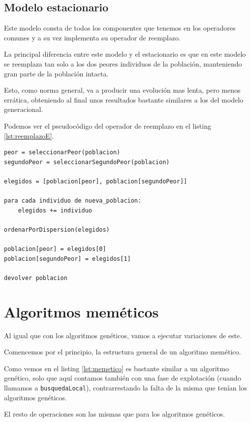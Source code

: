 \subsection{Modelo estacionario}

Este modelo consta de todos los componentes que tenemos en los operadores comunes y a su vez implementa su operador de reemplazo.

La principal diferencia entre este modelo y el estacionario es que en este modelo se reemplaza tan solo a los dos peores individuos de la población, manteniendo gran parte de la población intacta.

Esto, como norma general, va a producir una evolución mas lenta, pero menos errática, obteniendo al final unos resultados bastante similares a los del modelo generacional.

Podemos ver el pseudocódigo del operador de reemplazo en el listing \ref{lst:reemplazoE}.

\begin{lstlisting}[frame=single, caption={Reemplazo modelo estacionario}, captionpos=b, label=lst:reemplazoE]
peor = seleccionarPeor(poblacion)
segundoPeor = seleccionarSegundoPeor(poblacion)

elegidos = [poblacion[peor], poblacion[segundoPeor]]

para cada individuo de nueva_poblacion:
    elegidos += individuo

ordenarPorDispersion(elegidos)

poblacion[peor] = elegidos[0]
poblacion[segundoPeor] = elegidos[1]

devolver poblacion
\end{lstlisting}

\newpage

\section{Algoritmos meméticos}

Al igual que con los algoritmos genéticos, vamos a ejecutar variaciones de este.

Comencemos por el principio, la estructura general de un algoritmo memético.

Como vemos en el listing \ref{lst:memetico} es bastante similar a un algoritmo genético, solo que aquí contamos también con una fase de explotación (cuando llamamos a \texttt{busquedaLocal}), contrarrestando la falta de la misma que tenían los algoritmos genéticos.

El resto de operaciones son las mismas que para los algoritmos genéticos.

